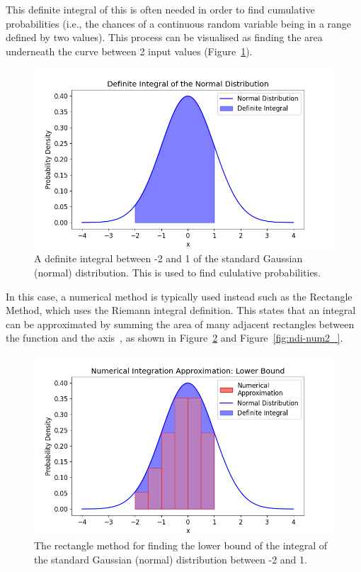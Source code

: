\documentclass[12pt]{article}
\newcommand{\ndiFigCaption}[1]{The rectangle method for finding the #1 bound of the integral of the standard Gaussian (normal) distribution between -2 and 1.}
\begin{document}
    This definite integral of this is often needed in order to find cumulative probabilities (i.e., the chances of a continuous random variable being in a range defined by two values).
    This process can be visualised as finding the area underneath the curve between 2 input values (Figure~\ref{fig:ndi_}).

    \begin{figure}[htbp]
        \centering
        \includegraphics[width=0.8\linewidth]{figures/ndi/ndi_}
        \caption{A definite integral between -2 and 1 of the standard Gaussian (normal) distribution. This is used to find cululative probabilities.}
        \label{fig:ndi_}
    \end{figure}

    In this case, a numerical method is typically used instead such as the Rectangle Method, which uses the Riemann integral definition.
    This states that an integral can be approximated by summing the area of many adjacent rectangles between the function and the axis~\cite{NumericalAnalysis2023}, as shown in Figure~\ref{fig:ndi-num_} and Figure~\ref{fig:ndi-num2_}.

    \FloatBarrier

    \begin{figure}[htbp]
        \centering
        \includegraphics[width=0.8\linewidth]{figures/ndi-num/ndi-num_}
        \caption{\ndiFigCaption{lower}}
        \label{fig:ndi-num_}
    \end{figure}
\end{document}
